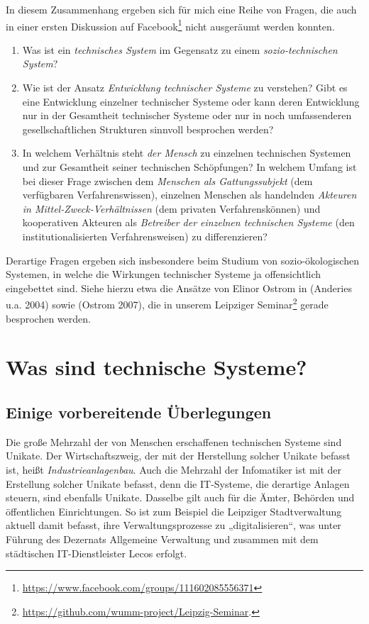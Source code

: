 \documentclass[11pt,a4paper]{article}
\begin{document}
In diesem Zusammenhang ergeben sich für mich eine Reihe von Fragen, die auch
in einer ersten Diskussion auf
Facebook\footnote{\url{https://www.facebook.com/groups/111602085556371}} nicht
ausgeräumt werden konnten.
\begin{enumerate}
\item Was ist ein \emph{technisches System} im Gegensatz zu einem
  \emph{sozio-technischen System}?
\item Wie ist der Ansatz \emph{Entwicklung technischer Systeme} zu verstehen?
  Gibt es eine Entwicklung einzelner technischer Systeme oder kann deren
  Entwicklung nur in der Gesamtheit technischer Systeme oder nur in noch
  umfassenderen gesellschaftlichen Strukturen sinnvoll besprochen werden?
\item In welchem Verhältnis steht \emph{der Mensch} zu einzelnen technischen
  Systemen und zur Gesamtheit seiner technischen Schöpfungen? In welchem
  Umfang ist bei dieser Frage zwischen dem \emph{Menschen als Gattungssubjekt}
  (dem verfügbaren Verfahrenswissen), einzelnen Menschen als handelnden
  \emph{Akteuren in Mittel-Zweck-Verhältnissen} (dem privaten
  Verfahrenskönnen) und kooperativen Akteuren als \emph{Betreiber der
    einzelnen technischen Systeme} (den institutionalisierten
  Verfahrensweisen) zu differenzieren?
\end{enumerate}

Derartige Fragen ergeben sich insbesondere beim Studium von sozio-ökologischen
Systemen, in welche die Wirkungen technischer Systeme ja offensichtlich
eingebettet sind.  Siehe hierzu etwa die Ansätze von Elinor Ostrom in
(Anderies u.a. 2004) sowie (Ostrom 2007), die in unserem Leipziger
Seminar\footnote{\url{https://github.com/wumm-project/Leipzig-Seminar}.}
gerade besprochen werden.

\section{Was sind technische Systeme?}

\subsection{Einige vorbereitende Überlegungen}

Die große Mehrzahl der von Menschen erschaffenen technischen Systeme sind
Unikate. Der Wirtschaftszweig, der mit der Herstellung solcher Unikate befasst
ist, heißt \emph{Industrieanlagenbau}. Auch die Mehrzahl der Infomatiker ist
mit der Erstellung solcher Unikate befasst, denn die IT-Systeme, die derartige
Anlagen steuern, sind ebenfalls Unikate.  Dasselbe gilt auch für die Ämter,
Behörden und öffentlichen Einrichtungen. So ist zum Beispiel die Leipziger
Stadtverwaltung aktuell damit befasst, ihre Verwaltungsprozesse zu
„digitalisieren“, was unter Führung des Dezernats Allgemeine Verwaltung und
zusammen mit dem städtischen IT-Dienstleister Lecos erfolgt.
\end{document}
